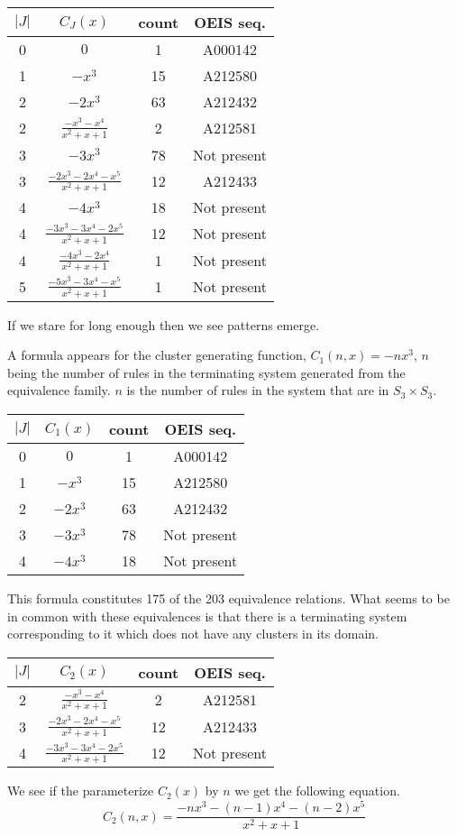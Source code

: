 \documentclass[a4paper, 11pt, english]{article}
\theoremstyle{definition}
\newcommand{\Sym}{S}
\begin{document}
\begin{center}
\begin{tabular}{c|c|c|c}
    $|J|$ & $C_J(x)$ & count & OEIS seq. \\
    \hline
    0 & $0$ & 1 & A000142 \\
    1 & $-x^3$ & 15 & A212580 \\
    2 & $-2x^3$ & 63 & A212432 \\
    2 & $\frac{-x^3-x^4}{x^2+x+1}$ & 2 & A212581 \\
    3 & $-3x^3$ & 78 & Not present \\
    3 & $\frac{-2x^3-2x^4-x^5}{x^2+x+1}$ & 12 & A212433 \\
    4 & $-4x^3$ & 18 & Not present \\
    4 & $\frac{-3x^3-3x^4-2x^5}{x^2+x+1}$ & 12 & Not present\\
    4 & $\frac{-4x^3-2x^4}{x^2+x+1}$ & 1 & Not present \\ 
    5 & $\frac{-5x^3-3x^4-x^5}{x^2+x+1}$ & 1 & Not present\\
\end{tabular}
\end{center}

If we stare for long enough then we see patterns emerge.

A formula appears for the cluster generating function, $C_1(n,x) = -nx^3$, $n$ being the number of rules
in the terminating system generated from the equivalence family. $n$ is the
number of rules in the system that are in $\Sym_3 \times \Sym_3$.
\begin{center}
\begin{tabular}{c|c|c|c}
    $|J|$ & $C_1(x)$ & count & OEIS seq. \\
    \hline
    0 & $0$ & 1 & A000142 \\
    1 & $-x^3$ & 15 & A212580 \\
    2 & $-2x^3$ & 63 & A212432 \\
    3 & $-3x^3$ & 78 & Not present \\
    4 & $-4x^3$ & 18 & Not present \\
\end{tabular}
\end{center}
This formula constitutes 175 of the 203 equivalence relations.
What seems to be in common with these equivalences is that there is a
terminating system corresponding to it which does not have any clusters in its
domain. 

\begin{center}
\begin{tabular}{c|c|c|c}
    $|J|$ & $C_2(x)$ & count & OEIS seq. \\
    \hline
    2 & $\frac{-x^3-x^4}{x^2+x+1}$ & 2 & A212581 \\
    3 & $\frac{-2x^3-2x^4-x^5}{x^2+x+1}$ & 12 & A212433 \\
    4 & $\frac{-3x^3-3x^4-2x^5}{x^2+x+1}$ & 12 & Not present\\
\end{tabular}
\end{center}
We see if the parameterize $C_2(x)$ by $n$ we get the following equation.
\[
    C_2(n,x) = \frac{-nx^3-(n-1)x^4-(n-2)x^5}{x^2+x+1}
\]
\end{document}
